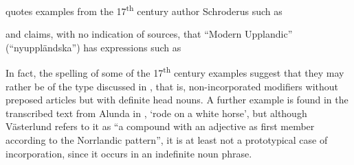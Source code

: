 \citet[523]{Hesselman1908} quotes examples from the 17\textsuperscript{th} century author Schroderus such as

\ea\label{}


\z 
\z 

and claims, with no indication of sources, that “Modern Upplandic” (“nyupp\-ländska”) has expressions such as


\ea\label{}

\z 
\z 

In fact, the spelling of some of the 17\textsuperscript{th} century examples suggest that they may rather be of the type discussed in , that is, non-incorporated modifiers without preposed articles but with definite head nouns. A further example is found in the transcribed text from Alunda in \citet[56]{Västerlund1988},  ‘rode on a white horse’, but although Västerlund refers to it as “a compound with an adjective as first member according to the Norrlandic pattern”, it is at least not a prototypical case of incorporation, since it occurs in an indefinite noun phrase.

